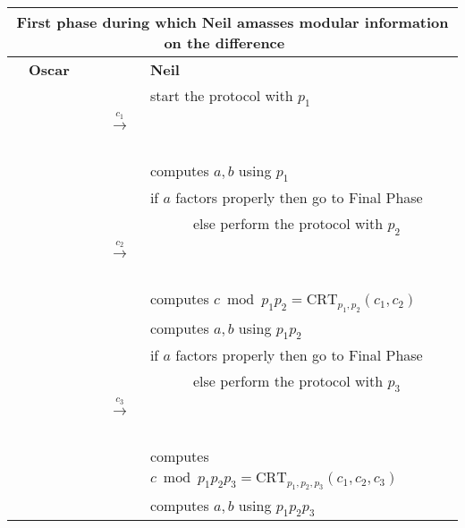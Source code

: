 \documentclass[11pt]{llncs}
\begin{document}
\begin{center}
\begin{tabular}{lcl}\toprule
\multicolumn{3}{c}{{\sf First phase during which Neil amasses modular
information on the difference~~}} \\\midrule
~~{\bf Oscar}                      &                                                      &   {\bf Neil}~\\
                                   &                                                      &start the protocol with $p_1$~\\
                                   &~~{{\LARGE $\stackrel{c_1}{\longrightarrow}$}}~~      &   \\
                                   &                                                      &computes $a,b$ using $p_1$~\\
                                   &                                                      &if $a$ factors properly then go to {\sf Final Phase}\\
                                   &                                                      &~~~~~~else perform the protocol with $p_2$~~\\
                                   &~~{{\LARGE $\stackrel{c_2}{\longrightarrow}$}}~~      &   \\
                                   &                                                      &computes $c \bmod p_1 p_2=\mbox{CRT}_{p_1,p_2}(c_1,c_2)$~~\\
                                   &                                                      &computes $a,b$ using $p_1 p_2$~\\
                                   &                                                      &if $a$ factors properly then go to {\sf Final Phase}\\
                                   &                                                      &~~~~~~else perform the protocol with $p_3$~~\\
                                   &~~{{\LARGE $\stackrel{c_3}{\longrightarrow}$}}~~      &   \\
                                   &                                                      &computes $c \bmod p_1 p_2 p_3=\mbox{CRT}_{p_1,p_2,p_3}(c_1,c_2,c_3)$~~\\
                                   &                                                      &computes $a,b$ using $p_1 p_2 p_3$~\\

\end{tabular}
\end{center}
\end{document}

